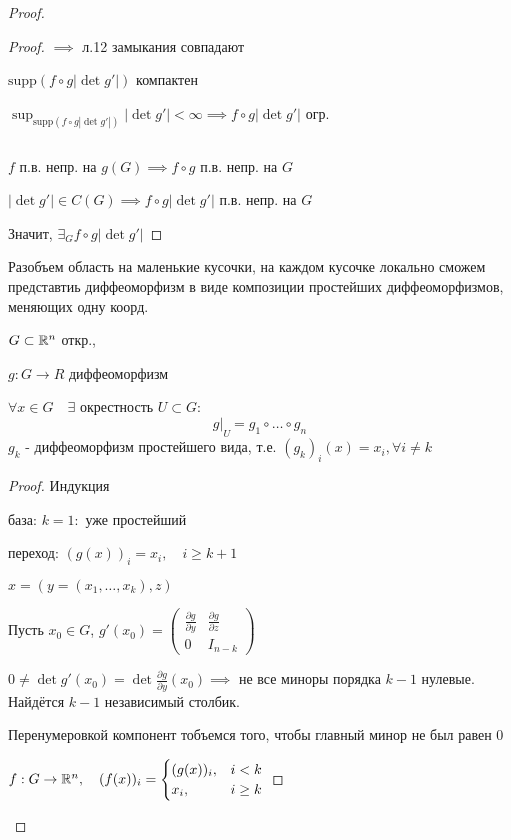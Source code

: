 \begin{proof}
\begin{proof}
        $\implies $ л.12 замыкания совпадают

        $\text{supp} (f \circ g |\det g'|)$ компактен

        $\sup_{\text{supp}(f\circ g |\det g'|)} |\det g'| < \infty \implies 
        f \circ g |\det g'|$ огр.

        \par $ $

        $f$ п.в. непр. на $g(G) \implies f \circ g $ п.в. непр. на $G$

        $| \det g'| \in C(G) \implies f \circ g |\det g'| $ п.в. непр. на $G$

        Значит, $\exists_G f\circ g |\det g' |$
    \end{proof}
    
    Разобъем область на маленькие кусочки, на каждом кусочке локально сможем представтиь
    диффеоморфизм в виде композиции простейших диффеоморфизмов, меняющих одну коорд.
    \begin{lemma} %
        $G \subset \mathbb{R}^n$ откр., 

        $g: G \to R$ диффеоморфизм

        $\forall x \in G \quad \exists$ окрестность $U \subset G$:
        $$g | \underset{ U}{ } = g_1 \circ \dotsc \circ g_n$$
        $g_k$ - диффеоморфизм простейшего вида, т.е. 
        $(g_k)_i (x) = x_i, \forall i \neq k$
    \end{lemma}

    \begin{proof}
        Индукция 

        база: $k=1:$ уже простейший

        переход: $(g(x))_i = x_i, \quad i \ge k+1$

        $x = (y = (x_1, \dotsc, x_k),z)$

        Пусть $x_0 \in G$, $g'(x_0) = 
        \begin{pmatrix}
            \frac{\partial g}{\partial y} & \frac{\partial g}{\partial z} \\
            0 & I_{n - k}   
        \end{pmatrix}
        $

        $0 \neq \det g'(x_0) = \det \frac{\partial g}{\partial y}(x_0) \implies $
        не все миноры порядка $k-1$ нулевые. Найдётся $k-1$ независимый столбик.
        
        Перенумеровкой компонент тобъемся того, чтобы главный минор не был равен 0
    
        $f: G \to \mathbb{R}^n, \quad (f(x))_i = \begin{cases}
            (g(x))_i, & i < k \\
            x_i, & i \ge k
        \end{cases}$


\end{proof}
\end{proof}

